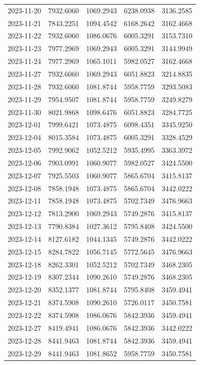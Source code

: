 \begin{footnotesize}
\begin{longtable}{lllll}
2023-11-20 & 7932.6060 & 1069.2943 & 6238.0938 & 3136.2585 \\
2023-11-21 & 7843.2251 & 1094.4542 & 6168.2642 & 3162.4668 \\
2023-11-22 & 7932.6060 & 1086.0676 & 6005.3291 & 3153.7310 \\
2023-11-23 & 7977.2969 & 1069.2943 & 6005.3291 & 3144.9949 \\
2023-11-24 & 7977.2969 & 1065.1011 & 5982.0527 & 3162.4668 \\
2023-11-27 & 7932.6060 & 1069.2943 & 6051.8823 & 3214.8835 \\
2023-11-28 & 7932.6060 & 1081.8744 & 5958.7759 & 3293.5083 \\
2023-11-29 & 7954.9507 & 1081.8744 & 5958.7759 & 3249.8279 \\
2023-11-30 & 8021.9868 & 1098.6476 & 6051.8823 & 3284.7725 \\
2023-12-01 & 7999.6421 & 1073.4875 & 6098.4351 & 3345.9250 \\
2023-12-04 & 8015.3584 & 1073.4875 & 6005.3291 & 3328.4529 \\
2023-12-05 & 7992.9062 & 1052.5212 & 5935.4995 & 3363.3972 \\
2023-12-06 & 7903.0991 & 1060.9077 & 5982.0527 & 3424.5500 \\
2023-12-07 & 7925.5503 & 1060.9077 & 5865.6704 & 3415.8137 \\
2023-12-08 & 7858.1948 & 1073.4875 & 5865.6704 & 3442.0222 \\
2023-12-11 & 7858.1948 & 1073.4875 & 5702.7349 & 3476.9663 \\
2023-12-12 & 7813.2900 & 1069.2943 & 5749.2876 & 3415.8137 \\
2023-12-13 & 7790.8384 & 1027.3612 & 5795.8408 & 3424.5500 \\
2023-12-14 & 8127.6182 & 1044.1345 & 5749.2876 & 3442.0222 \\
2023-12-15 & 8284.7822 & 1056.7145 & 5772.5645 & 3476.9663 \\
2023-12-18 & 8262.3301 & 1052.5212 & 5702.7349 & 3468.2305 \\
2023-12-19 & 8307.2344 & 1090.2610 & 5749.2876 & 3468.2305 \\
2023-12-20 & 8352.1377 & 1081.8744 & 5795.8408 & 3459.4941 \\
2023-12-21 & 8374.5908 & 1090.2610 & 5726.0117 & 3450.7581 \\
2023-12-22 & 8374.5908 & 1086.0676 & 5842.3936 & 3459.4941 \\
2023-12-27 & 8419.4941 & 1086.0676 & 5842.3936 & 3442.0222 \\
2023-12-28 & 8441.9463 & 1081.8744 & 5842.3936 & 3459.4941 \\
2023-12-29 & 8441.9463 & 1081.8652 & 5958.7759 & 3450.7581 \\
\end{longtable}
\end{footnotesize}

